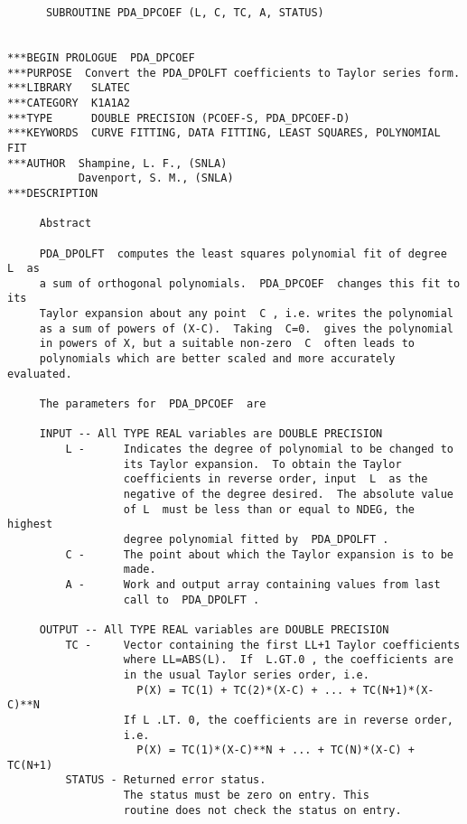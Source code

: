 

\begin{verbatim}
      SUBROUTINE PDA_DPCOEF (L, C, TC, A, STATUS)


***BEGIN PROLOGUE  PDA_DPCOEF
***PURPOSE  Convert the PDA_DPOLFT coefficients to Taylor series form.
***LIBRARY   SLATEC
***CATEGORY  K1A1A2
***TYPE      DOUBLE PRECISION (PCOEF-S, PDA_DPCOEF-D)
***KEYWORDS  CURVE FITTING, DATA FITTING, LEAST SQUARES, POLYNOMIAL FIT
***AUTHOR  Shampine, L. F., (SNLA)
           Davenport, S. M., (SNLA)
***DESCRIPTION

     Abstract

     PDA_DPOLFT  computes the least squares polynomial fit of degree  L  as
     a sum of orthogonal polynomials.  PDA_DPCOEF  changes this fit to its
     Taylor expansion about any point  C , i.e. writes the polynomial
     as a sum of powers of (X-C).  Taking  C=0.  gives the polynomial
     in powers of X, but a suitable non-zero  C  often leads to
     polynomials which are better scaled and more accurately evaluated.

     The parameters for  PDA_DPCOEF  are

     INPUT -- All TYPE REAL variables are DOUBLE PRECISION
         L -      Indicates the degree of polynomial to be changed to
                  its Taylor expansion.  To obtain the Taylor
                  coefficients in reverse order, input  L  as the
                  negative of the degree desired.  The absolute value
                  of L  must be less than or equal to NDEG, the highest
                  degree polynomial fitted by  PDA_DPOLFT .
         C -      The point about which the Taylor expansion is to be
                  made.
         A -      Work and output array containing values from last
                  call to  PDA_DPOLFT .

     OUTPUT -- All TYPE REAL variables are DOUBLE PRECISION
         TC -     Vector containing the first LL+1 Taylor coefficients
                  where LL=ABS(L).  If  L.GT.0 , the coefficients are
                  in the usual Taylor series order, i.e.
                    P(X) = TC(1) + TC(2)*(X-C) + ... + TC(N+1)*(X-C)**N
                  If L .LT. 0, the coefficients are in reverse order,
                  i.e.
                    P(X) = TC(1)*(X-C)**N + ... + TC(N)*(X-C) + TC(N+1)
         STATUS - Returned error status.
                  The status must be zero on entry. This
                  routine does not check the status on entry.


\end{verbatim}
